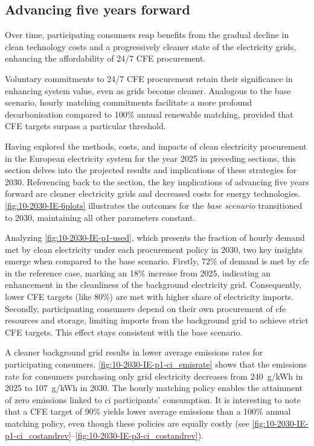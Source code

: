 \subsection{Advancing five years forward}
\label{subsec:time}

\begin{res}
    Over time, participating consumers reap benefits from the gradual decline in clean technology costs and a progressively cleaner state of the electricity grids, enhancing the affordability of 24/7 CFE procurement.
\end{res}

\begin{res}
    Voluntary commitments to 24/7 CFE procurement retain their significance in enhancing system value, even as grids become cleaner. Analogous to the base scenario, hourly matching commitments facilitate a more profound decarbonisation compared to 100\% annual renewable matching, provided that CFE targets surpass a particular threshold.
\end{res}

Having explored the methods, costs, and impacts of clean electricity procurement in the European electricity system for the year 2025 in preceding sections, this section delves into the projected results and implications of these strategies for 2030.
Referencing back to the  section, the key implications of advancing five years forward are cleaner electricity grids and decreased costs for energy  technologies. \cref{fig:10-2030-IE-6plots} illustrates the outcomes for the \textit{base scenario} transitioned to 2030, maintaining all other parameters constant. 

Analyzing \cref{fig:10-2030-IE-p1-used}, which presents the fraction of hourly demand met by clean electricity under each procurement policy in 2030, two key insights emerge when compared to the base scenario.
Firstly, 72\% of demand is met by \gls{cfe} in the reference case, marking an 18\% increase from 2025, indicating an enhancement in the cleanliness of the background electricity grid.
Consequently, lower CFE targets (like 80\%) are met with higher share of electricity imports.
Secondly, participanting consumers depend on their own procurement of \gls{cfe} resources and storage, limiting imports from the background grid to achieve strict CFE targets. 
This effect stays consistent with the base scenario.

A cleaner background grid results in lower average emissions rates for participating consumers.
\cref{fig:10-2030-IE-p1-ci_emisrate} shows that the emissions rate for consumers purchasing only grid electricity decreases from 240~g\co/kWh in 2025 to 107~g\co/kWh in 2030.
The hourly matching policy enables the attainment of zero emissions linked to \gls{ci} participants' consumption.
It is interesting to note that a CFE target of 90\% yields lower average emissions than a 100\% annual matching policy, even though these policies are equally costly (see \cref{fig:10-2030-IE-p1-ci_costandrev}--\cref{fig:10-2030-IE-p3-ci_costandrev}).

